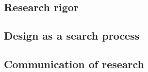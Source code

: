 \documentclass[../Main/thesis.tex]{subfiles}
\begin{document}
\subsection*{Research rigor}%
\label{sub:research_rigor}

\subsection*{Design as a search process}%
\label{sub:design_as_a_search_process}

\subsection*{Communication of research}%
\label{sub:communication_of_research}











\blankpage
\end{document}
